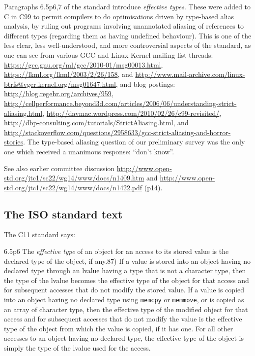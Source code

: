 \documentclass[acmsmall,review,screen]{acmart}\settopmatter{printfolios=true,printccs=false,printacmref=false}
\begin{document}
Paragraphs 6.5p{6,7} of the standard introduce \emph{effective
  types}. 
These were added to C in C99 to 
permit compilers to do optimisations driven by type-based alias
analysis, by ruling out programs involving unannotated aliasing of
references to different types (regarding them as having undefined
behaviour). 
This is one of the less clear, less well-understood, and more controversial aspects of the
standard, as one can see from 
various
GCC and Linux Kernel mailing list threads:
\url{https://gcc.gnu.org/ml/gcc/2010-01/msg00013.html},
\url{https://lkml.org/lkml/2003/2/26/158}, and
\url{http://www.mail-archive.com/linux-btrfs@vger.kernel.org/msg01647.html},
and blog postings:
\url{http://blog.regehr.org/archives/959},
\url{http://cellperformance.beyond3d.com/articles/2006/06/understanding-strict-aliasing.html},
\url{http://davmac.wordpress.com/2010/02/26/c99-revisited/},
\url{http://dbp-consulting.com/tutorials/StrictAliasing.html}, and
\url{http://stackoverflow.com/questions/2958633/gcc-strict-aliasing-and-horror-stories}.
The type-based aliasing question of our preliminary survey was the
only one which received a unanimous response: ``don't know''. 


See also earlier committee discussion \url{http://www.open-std.org/jtc1/sc22/wg14/www/docs/n1409.htm} and \url{http://www.open-std.org/jtc1/sc22/wg14/www/docs/n1422.pdf} (p14). 


\subsection{The ISO standard text}
                                   
The C11 standard says:

\medskip

6.5p6 The \emph{effective type} of an object for an access to
its stored value is the declared type of the object, if any.87) If a
value is stored into an object having no declared type through an
lvalue having a type that is not a character type, then the type of
the lvalue becomes the effective type of the object for that access
and for subsequent accesses that do not modify the stored value. If
a value is copied into an object having no declared type using
\lstinline{memcpy} or \lstinline{memmove}, or is copied as an array of
character type, then the effective type of the modified object for
that access and for subsequent accesses that do not modify the value
is the effective type of the object from which the value is copied,
if it has one. For all other accesses to an object having no
declared type, the effective type of the object is simply the type
of the lvalue used for the access.
\end{document}
